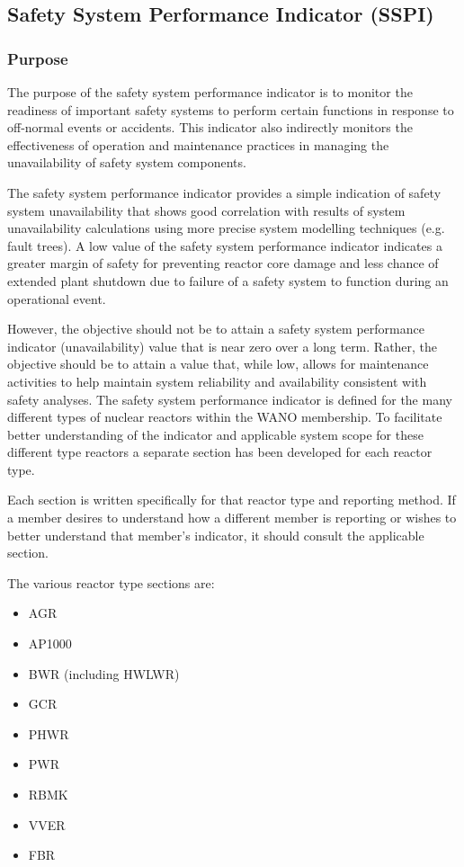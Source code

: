 \subsection{Safety System Performance Indicator (SSPI) }

\subsubsection{Purpose}

The purpose of the safety system performance indicator is to monitor
the readiness of important safety systems to perform certain functions
in response to off-normal events or accidents. This indicator also
indirectly monitors the effectiveness of operation and maintenance
practices in managing the unavailability of safety system components.

The safety system performance indicator provides a simple indication
of safety system unavailability that shows good correlation with
results of system unavailability calculations using more precise
system modelling techniques (e.g. fault trees). A low value of the
safety system performance indicator indicates a greater margin of
safety for preventing reactor core damage and less chance of extended
plant shutdown due to failure of a safety system to function during an
operational event.

However, the objective should not be to attain a safety system performance indicator (unavailability) value that is near zero over a long term. Rather, the objective should be to attain a value that, while low, allows for maintenance activities to help maintain system reliability and availability consistent with safety analyses.
The safety system performance indicator is defined for the many
different types of nuclear reactors within the WANO membership. To
facilitate better understanding of the indicator and applicable system
scope for these different type reactors a separate section has been
developed for each reactor type.

Each section is written specifically for that reactor type and
reporting method. If a member desires to understand how a different
member is reporting or wishes to better understand that member's
indicator, it should consult the applicable section.

The various reactor type sections are:
\begin{itemize}
\item AGR
\item AP1000
\item BWR (including HWLWR)
\item GCR
\item PHWR
\item PWR
\item RBMK
\item VVER
\item FBR
\end{itemize}

